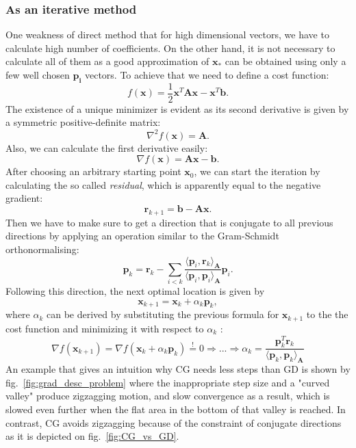\subsubsection{As an iterative method} One weakness of direct method that for high dimensional vectors, we have to calculate high number of coefficients. On the other hand, it is not necessary to calculate all of them as a good approximation of $\mathbf{x_* }$ can be obtained using only a few well chosen $\mathbf{p_i}$ vectors. To achieve that we need to define a cost function:
$$f(\mathbf{x}) = \frac{1}{2}\mathbf{x}^T \mathbf{Ax} - \mathbf{x}^T \mathbf{b}.$$
The existence of a unique minimizer is evident as its second derivative is given by a symmetric positive-definite matrix:
\[\nabla^2 f(\mathbf{x}) = \mathbf{A}.\]
Also, we can calculate the first derivative easily:
\[\nabla f(\mathbf{x}) = \mathbf{Ax} - \mathbf{b}.\]
After choosing an arbitrary starting point $\mathbf{x}_0$, we can start the iteration by calculating the so called \textit{residual}, which is apparently equal to the negative gradient:
\[\mathbf{r}_{k+1} = \mathbf{b} - \mathbf{Ax}.\]
Then we have to make sure to get a direction that is conjugate to all previous directions by applying an operation similar to the Gram-Schmidt orthonormalising:
\[\mathbf{p}_k = \mathbf{r}_k - \sum_{i<k} \frac{\langle \mathbf{p}_i, \mathbf{r}_k \rangle_\mathbf{A}}{\langle \mathbf{p}_i, \mathbf{p}_i \rangle_\mathbf{A}} \mathbf{p}_i.\]
Following this direction, the next optimal location is given by
\[\mathbf{x}_{k+1} = \mathbf{x}_k + \alpha_k \mathbf{p}_k,\]
where $\alpha_k$ can be derived by substituting the previous formula for $\mathbf{x}_{k+1}$ to the the cost function and minimizing it with respect to $\alpha_k$ :
\[\nabla f(\mathbf{x}_{k+1}) = \nabla f(\mathbf{x}_k + \alpha_k \mathbf{p}_k)  \overset{!}{=} 0 \Rightarrow ... \Rightarrow \alpha_k = \frac{\mathbf{p}_k^T \mathbf{r}_k}{\langle \mathbf{p}_k, \mathbf{p}_k \rangle_\mathbf{A}}\]
An example that gives an intuition why CG needs less steps than GD is shown by fig.~\ref{fig:grad_desc_problem} where the inappropriate step size and a "curved valley" produce zigzagging motion, and slow convergence as a result, which is slowed even further when the flat area in the bottom of that valley is reached. In contrast, CG avoids zigzagging because of the constraint of conjugate directions as it is depicted on fig.~\ref{fig:CG_vs_GD}.

